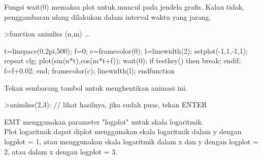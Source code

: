 \documentclass[12pt,arial,letterpaper]{book}
\begin{document}
\begin{eulercomment}
\begin{eulercomment}
\begin{eulercomment}
\begin{eulercomment}
\begin{eulercomment}
\begin{eulercomment}
\begin{eulercomment}
\begin{eulercomment}
\begin{eulercomment}
\begin{eulercomment}
\begin{eulercomment}
\begin{eulercomment}
\begin{eulercomment}
\begin{eulercomment}
\begin{eulercomment}
\begin{eulercomment}
\begin{eulercomment}
Fungsi wait(0) memaksa plot untuk muncul pada jendela grafis. Kalau
tidak, penggambaran ulang dilakukan dalam interval waktu yang jarang.
\end{eulercomment}
\begin{eulerprompt}
>function animliss (n,m) ...
\end{eulerprompt}
\begin{eulerudf}
  t=linspace(0,2pi,500);
  f=0;
  c=framecolor(0);
  l=linewidth(2);
  setplot(-1,1,-1,1);
  repeat
    clg;
    plot(sin(n*t),cos(m*t+f));
    wait(0);
    if testkey() then break; endif;
    f=f+0.02;
  end;
  framecolor(c);
  linewidth(l);
  endfunction
\end{eulerudf}
\begin{eulercomment}
Tekan sembarang tombol untuk menghentikan animasi ini.
\end{eulercomment}
\begin{eulerprompt}
>animliss(2,3): // lihat hasilnya, jika sudah puas, tekan ENTER
\end{eulerprompt}
\begin{eulercomment}
EMT menggunakan parameter "logplot" untuk skala logaritmik.\\
Plot logaritmik dapat diplot menggunakan skala logaritmik dalam y
dengan logplot = 1, atau menggunakan skala logaritmik dalam x dan y
dengan logplot = 2, atau dalam x dengan logplot = 3.


\end{eulercomment}
\end{eulercomment}
\end{eulercomment}
\end{eulercomment}
\end{eulercomment}
\end{eulercomment}
\end{eulercomment}
\end{eulercomment}
\end{eulercomment}
\end{eulercomment}
\end{eulercomment}
\end{eulercomment}
\end{eulercomment}
\end{eulercomment}
\end{eulercomment}
\end{eulercomment}
\end{eulercomment}
\end{document}
